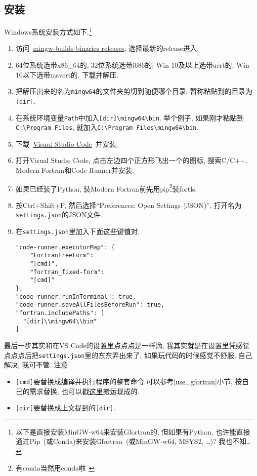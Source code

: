 \subsection{安装}

Windows系统安装方式如下.\footnote{
    以下是直接安装MinGW-w64来安装Gfortran的, 但如果有Python, 也许能直接通过Pip~(或Conda)来安装Gfortran~(或MinGW-w64, MSYS2, \dots)? 我也不知\dots
}
\begin{enumerate}
    \item 访问~\href{https://github.com/niXman/mingw-builds-binaries/releases}
    {mingw-builds-binaries releases}, 选择最新的release进入.
    \item 64位系统选带x86\_64的, 32位系统选带i686的; Win 10及以上选带ucrt的, Win 10以下选带msvcrt的. 下载并解压.
    \item 把解压出来的名为\verb|mingw64|的文件夹剪切到随便哪个目录. 暂称粘贴到的目录为\verb|[dir]|.
    \item 在系统环境变量\verb|Path|中加入\verb|[dir]\mingw64\bin|. 举个例子, 如果刚才粘贴到\verb|C:\Program Files|, 就加入\verb|C:\Program Files\mingw64\bin|.
    \item 下载~\href{https://code.visualstudio.com/sha/download?build=stable&os=win32-x64-user}
    {Visual Studio Code}~并安装.
    \item 打开Visual Studio Code, 点击左边四个正方形飞出一个的图标, 搜索C/C++, Modern Fortran和Code Runner并安装.
    \item[] 如果已经装了Python, 装Modern Fortran前先用pip\footnote{有conda当然用conda啦$\!\text{\~{}}$}装fortls.
    \item 按Ctrl+Shift+P, 然后选择``Preferences: Open Settings (JSON)'', 打开名为\verb|settings.json|的JSON文件.
    \item 在\verb|settings.json|里加入下面这些键值对.
    \begin{verbatim}
"code-runner.executorMap": {
    "FortranFreeForm":
    "[cmd]",
    "fortran_fixed-form":
    "[cmd]"
},
"code-runner.runInTerminal": true,
"code-runner.saveAllFilesBeforeRun": true,
"fortran.includePaths": [
  "[dir]\\mingw64\\bin"
]
    \end{verbatim}
\end{enumerate}

最后一步其实和在VS Code的设置里点点点是一样滴, 我其实就是在设置里凭感觉点点点后把\verb|settings.json|里的东东弄出来了, 如果玩代码的时候感觉不舒服, 自己解决, 我可不管. 注意
\begin{itemize}
    \item \verb|[cmd]|要替换成编译并执行程序的整套命令.可以参考\ref{use_gfortran}小节, 按自己的需求替换, 也可以戳\href{https://zhuanlan.zhihu.com/p/362328064}{这里}搬运现成的.
    \item \verb|[dir]|要替换成上文提到的\verb|[dir]|.
\end{itemize}

